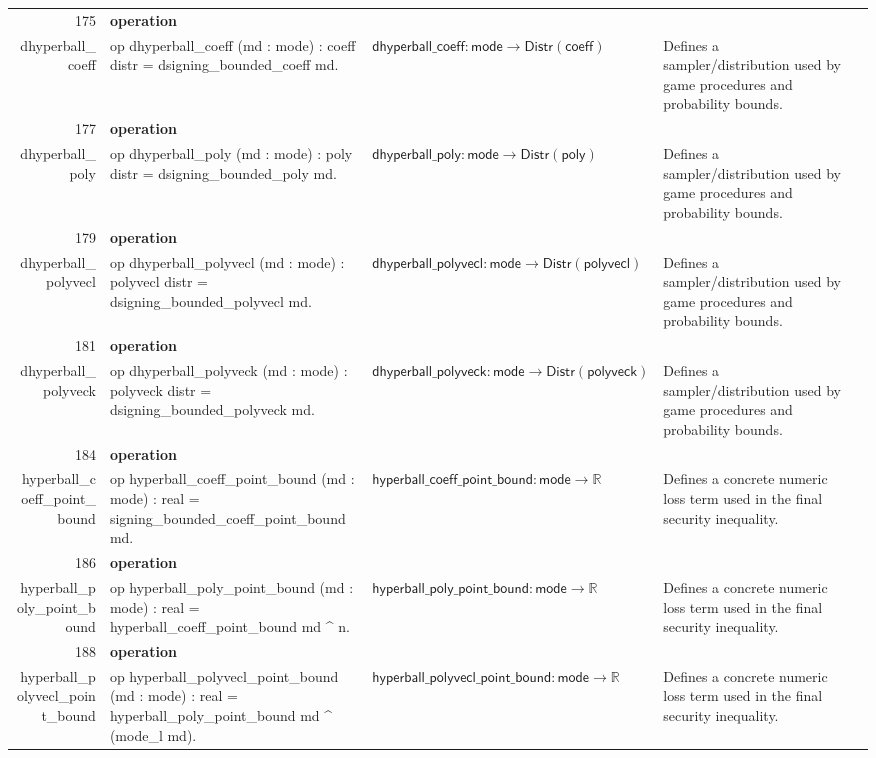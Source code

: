 \documentclass[10pt]{article}
\newcommand{\ec}[1]{\begingroup\ttfamily\scriptsize #1\endgroup}
\begin{document}
\begin{longtable}{r L{0.17\textwidth} L{0.26\textwidth} L{0.27\textwidth} L{0.20\textwidth}}
175 & \textbf{operation}\\\ec{dhyperball\_coeff} & \ec{op dhyperball\_coeff (md : mode) : coeff distr = dsigning\_bounded\_coeff md.} & \(\mathsf{dhyperball\_coeff} : \mathsf{mode} \to \mathsf{Distr}(\mathsf{coeff})\) & Defines a sampler/distribution used by game procedures and probability bounds. \\
177 & \textbf{operation}\\\ec{dhyperball\_poly} & \ec{op dhyperball\_poly (md : mode) : poly distr = dsigning\_bounded\_poly md.} & \(\mathsf{dhyperball\_poly} : \mathsf{mode} \to \mathsf{Distr}(\mathsf{poly})\) & Defines a sampler/distribution used by game procedures and probability bounds. \\
179 & \textbf{operation}\\\ec{dhyperball\_polyvecl} & \ec{op dhyperball\_polyvecl (md : mode) : polyvecl distr = dsigning\_bounded\_polyvecl md.} & \(\mathsf{dhyperball\_polyvecl} : \mathsf{mode} \to \mathsf{Distr}(\mathsf{polyvecl})\) & Defines a sampler/distribution used by game procedures and probability bounds. \\
181 & \textbf{operation}\\\ec{dhyperball\_polyveck} & \ec{op dhyperball\_polyveck (md : mode) : polyveck distr = dsigning\_bounded\_polyveck md.} & \(\mathsf{dhyperball\_polyveck} : \mathsf{mode} \to \mathsf{Distr}(\mathsf{polyveck})\) & Defines a sampler/distribution used by game procedures and probability bounds. \\
184 & \textbf{operation}\\\ec{hyperball\_coeff\_point\_bound} & \ec{op hyperball\_coeff\_point\_bound (md : mode) : real = signing\_bounded\_coeff\_point\_bound md.} & \(\mathsf{hyperball\_coeff\_point\_bound} : \mathsf{mode} \to \mathbb{R}\) & Defines a concrete numeric loss term used in the final security inequality. \\
186 & \textbf{operation}\\\ec{hyperball\_poly\_point\_bound} & \ec{op hyperball\_poly\_point\_bound (md : mode) : real = hyperball\_coeff\_point\_bound md \textasciicircum{} n.} & \(\mathsf{hyperball\_poly\_point\_bound} : \mathsf{mode} \to \mathbb{R}\) & Defines a concrete numeric loss term used in the final security inequality. \\
188 & \textbf{operation}\\\ec{hyperball\_polyvecl\_point\_bound} & \ec{op hyperball\_polyvecl\_point\_bound (md : mode) : real = hyperball\_poly\_point\_bound md \textasciicircum{} (mode\_l md).} & \(\mathsf{hyperball\_polyvecl\_point\_bound} : \mathsf{mode} \to \mathbb{R}\) & Defines a concrete numeric loss term used in the final security inequality. \\

\end{longtable}
\end{document}
